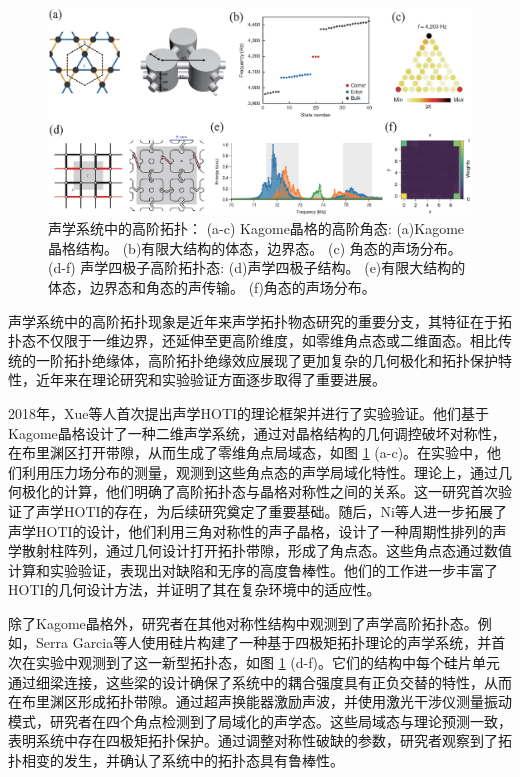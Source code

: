 \begin{figure}[h!]
    \centering
    \includegraphics[width=1\textwidth]{images/fig1-11.eps} 
    \caption{声学系统中的高阶拓扑：
    (a-c) Kagome晶格的高阶角态\cite{i4}: (a)Kagome晶格结构。 (b)有限大结构的体态，边界态。 (c) 角态的声场分布。 
    (d-f) 声学四极子高阶拓扑态\cite{i6}: (d)声学四极子结构。 (e)有限大结构的体态，边界态和角态的声传输。 (f)角态的声场分布。
    }
    \label{fig_1_11}
\end{figure}

声学系统中的高阶拓扑现象是近年来声学拓扑物态研究的重要分支，其特征在于拓扑态不仅限于一维边界，还延伸至更高阶维度，如零维角点态或二维面态。相比传统的一阶拓扑绝缘体，高阶拓扑绝缘效应展现了更加复杂的几何极化和拓扑保护特性，近年来在理论研究和实验验证方面逐步取得了重要进展。

2018年，Xue等人首次提出声学HOTI的理论框架并进行了实验验证\cite{i4}。他们基于Kagome晶格设计了一种二维声学系统，通过对晶格结构的几何调控破坏对称性，在布里渊区打开带隙，从而生成了零维角点局域态，如图 \ref{fig_1_11}  (a-c)。在实验中，他们利用压力场分布的测量，观测到这些角点态的声学局域化特性。理论上，通过几何极化的计算，他们明确了高阶拓扑态与晶格对称性之间的关系。这一研究首次验证了声学HOTI的存在，为后续研究奠定了重要基础。随后，Ni等人进一步拓展了声学HOTI的设计\cite{i5}，他们利用三角对称性的声子晶格，设计了一种周期性排列的声学散射柱阵列，通过几何设计打开拓扑带隙，形成了角点态。这些角点态通过数值计算和实验验证，表现出对缺陷和无序的高度鲁棒性。他们的工作进一步丰富了HOTI的几何设计方法，并证明了其在复杂环境中的适应性。

除了Kagome晶格外，研究者在其他对称性结构中观测到了声学高阶拓扑态\cite{i6}。例如，Serra Garcia等人使用硅片构建了一种基于四极矩拓扑理论的声学系统，并首次在实验中观测到了这一新型拓扑态，如图 \ref{fig_1_11}  (d-f)。它们的结构中每个硅片单元通过细梁连接，这些梁的设计确保了系统中的耦合强度具有正负交替的特性，从而在布里渊区形成拓扑带隙。通过超声换能器激励声波，并使用激光干涉仪测量振动模式，研究者在四个角点检测到了局域化的声学态。这些局域态与理论预测一致，表明系统中存在四极矩拓扑保护。通过调整对称性破缺的参数，研究者观察到了拓扑相变的发生，并确认了系统中的拓扑态具有鲁棒性。


